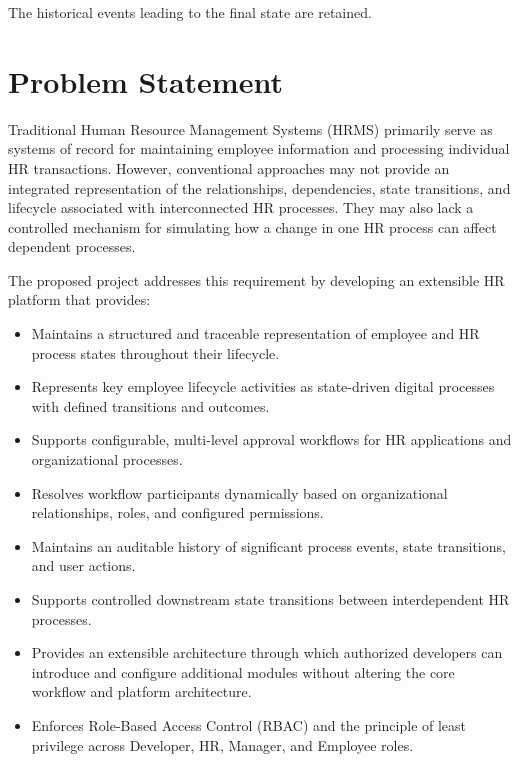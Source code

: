 \documentclass[12pt,a4paper]{article}
\begin{document}
The historical events leading to the final state are retained.


\section{Problem Statement}

Traditional Human Resource Management Systems (HRMS) primarily
serve as systems of record for maintaining employee information and
processing individual HR transactions. However, conventional
approaches may not provide an integrated representation of the
relationships, dependencies, state transitions, and lifecycle
associated with interconnected HR processes. They may also lack a
controlled mechanism for simulating how a change in one HR process
can affect dependent processes.

The proposed project addresses this requirement by developing an
extensible HR platform that provides:

\begin{itemize}

    \item Maintains a structured and traceable representation of
    employee and HR process states throughout their lifecycle.

    \item Represents key employee lifecycle activities as
    state-driven digital processes with defined transitions and
    outcomes.

    \item Supports configurable, multi-level approval workflows for
    HR applications and organizational processes.

    \item Resolves workflow participants dynamically based on
    organizational relationships, roles, and configured
    permissions.

    \item Maintains an auditable history of significant process
    events, state transitions, and user actions.

    \item Supports controlled downstream state transitions between
    interdependent HR processes.

    \item Provides an extensible architecture through which
    authorized developers can introduce and configure additional
    modules without altering the core workflow and platform
    architecture.

    \item Enforces Role-Based Access Control (RBAC) and the
    principle of least privilege across Developer, HR, Manager, and
    Employee roles.

\end{itemize}
\end{document}
